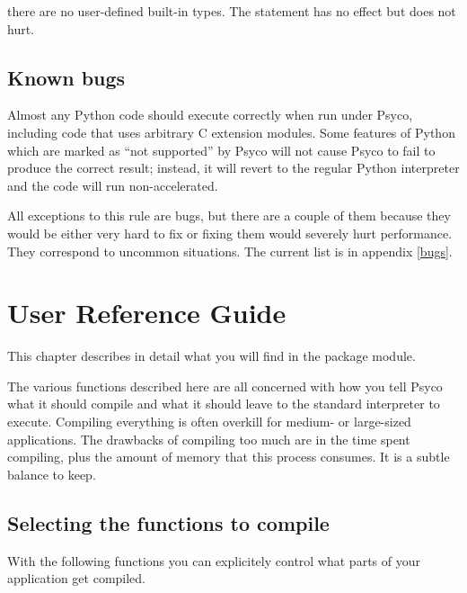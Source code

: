\documentclass{manual}
\begin{document}
 there are no user-defined built-in types.  The statement  has no effect but does not hurt.


\section{Known bugs}

Almost any Python code should execute correctly when run under Psyco, including code that uses arbitrary C extension modules.  Some features of Python which are marked as ``not supported'' by Psyco will not cause Psyco to fail to produce the correct result; instead, it will revert to the regular Python interpreter and the code will run non-accelerated.

All exceptions to this rule are bugs, but there are a couple of them because they would be either very hard to fix or fixing them would severely hurt performance.  They correspond to uncommon situations.  The current list is in appendix \ref{bugs}.




\chapter{User Reference Guide}


This chapter describes in detail what you will find in the  package module.

The various functions described here are all concerned with how you tell Psyco what it should compile and what it should leave to the standard interpreter to execute.  Compiling everything is often overkill for medium- or large-sized applications.  The drawbacks of compiling too much are in the time spent compiling, plus the amount of memory that this process consumes.  It is a subtle balance to keep.


\section{Selecting the functions to compile}

With the following functions you can explicitely control what parts of your application get compiled.
\end{document}
